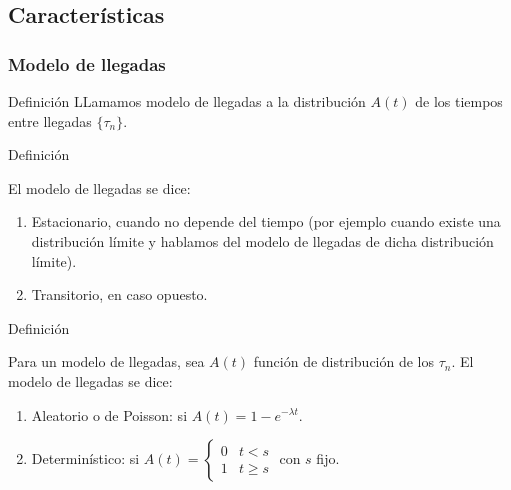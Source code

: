 \documentclass[8pt]{beamer}
\begin{document}
  \subsection{Características}
  \begin{frame}\frametitle{Modelo de llegadas}
    \begin{block}{Definición}
    LLamamos modelo de llegadas a la distribución $A(t)$ de los tiempos entre llegadas $\{\tau_n\}$.
    \end{block}
    \begin{block}{Definición}

    El modelo de llegadas se dice:
 
    \begin{enumerate}
    \item Estacionario, cuando no depende del tiempo (por ejemplo cuando existe una distribución límite y hablamos
      del modelo de llegadas de dicha distribución límite).
    \item Transitorio, en caso opuesto.
    \end{enumerate}
    \end{block}
    \begin{block}{Definición}

      Para un modelo de llegadas, sea $A(t)$ función de distribución de los $\tau_n$.
      El modelo de llegadas se dice:

      \begin{enumerate}
      \item Aleatorio o de Poisson: si $A(t) = 1 - e^{-\lambda t}$.
      \item Determinístico: si $A(t) = \left\{\begin{array}{ll}
        0 & t<s \\
        1 & t\ge s
      \end{array}\right.$ con $s$ fijo.

      \end{enumerate}
    \end{block}
  \end{frame}
\end{document}
